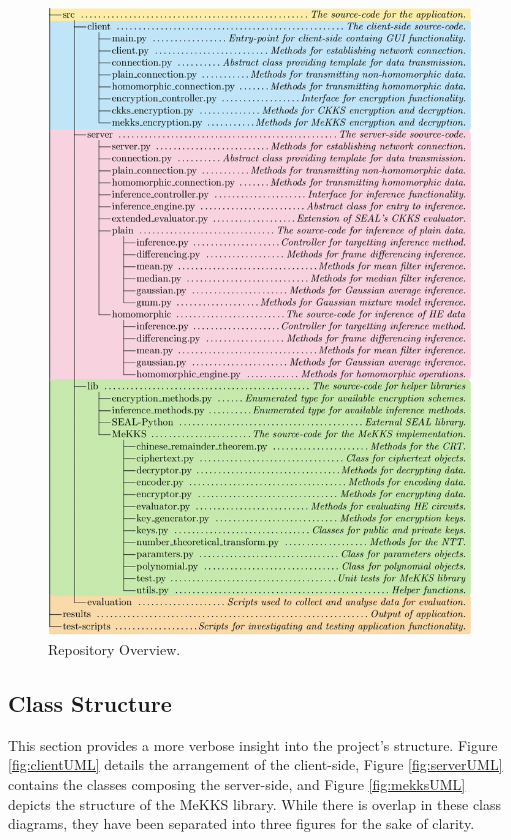 \begin{figure}[htp]     
    \includegraphics[scale=0.97]{figures/repositoryOverview}
    \caption[Repository Overview]{Repository Overview.}
    \label{fig:filetree}
\end{figure}
\setlength{\leftskip}{0cm}
\subsection{Class Structure}
\setlength{\leftskip}{0.5cm}
\indent \indent
This section provides a more verbose insight into the project's structure. Figure \ref{fig:clientUML} details the arrangement of the client-side, Figure \ref{fig:serverUML} contains the classes composing the server-side, and Figure \ref{fig:mekksUML} depicts the structure of the MeKKS library. While there is overlap in these class diagrams, they have been separated into three figures for the sake of clarity.

